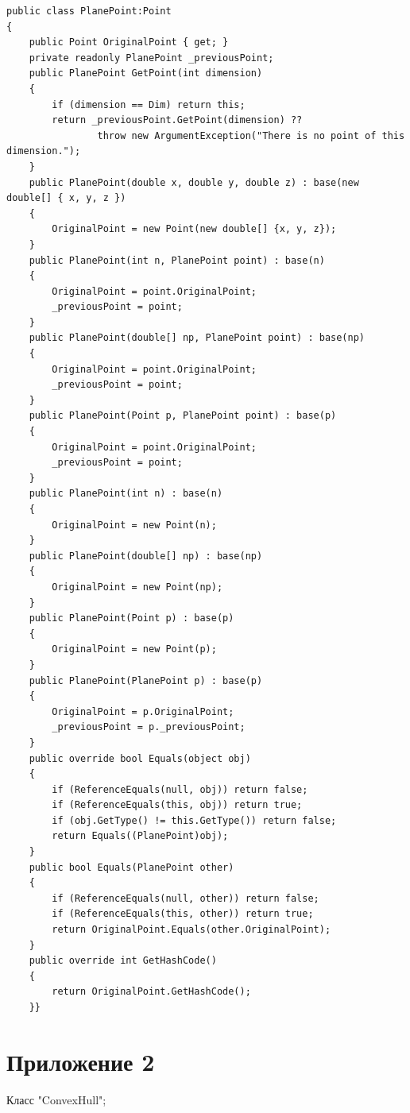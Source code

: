 \documentclass[14pt]{extarticle}
\begin{document}
\begin{lstlisting}[]
public class PlanePoint:Point
{
    public Point OriginalPoint { get; }
    private readonly PlanePoint _previousPoint;
    public PlanePoint GetPoint(int dimension)
    {
        if (dimension == Dim) return this;
        return _previousPoint.GetPoint(dimension) ??
                throw new ArgumentException("There is no point of this dimension.");
    }
    public PlanePoint(double x, double y, double z) : base(new double[] { x, y, z })
    {
        OriginalPoint = new Point(new double[] {x, y, z});
    }
    public PlanePoint(int n, PlanePoint point) : base(n)
    {
        OriginalPoint = point.OriginalPoint;
        _previousPoint = point;
    }
    public PlanePoint(double[] np, PlanePoint point) : base(np)
    {
        OriginalPoint = point.OriginalPoint;
        _previousPoint = point;
    }
    public PlanePoint(Point p, PlanePoint point) : base(p)
    {
        OriginalPoint = point.OriginalPoint;
        _previousPoint = point;
    }
    public PlanePoint(int n) : base(n)
    {
        OriginalPoint = new Point(n);
    }
    public PlanePoint(double[] np) : base(np)
    {
        OriginalPoint = new Point(np);
    }
    public PlanePoint(Point p) : base(p)
    {
        OriginalPoint = new Point(p);
    }
    public PlanePoint(PlanePoint p) : base(p)
    {
        OriginalPoint = p.OriginalPoint;
        _previousPoint = p._previousPoint;
    }
    public override bool Equals(object obj)
    {
        if (ReferenceEquals(null, obj)) return false;
        if (ReferenceEquals(this, obj)) return true;
        if (obj.GetType() != this.GetType()) return false;
        return Equals((PlanePoint)obj);
    }
    public bool Equals(PlanePoint other)
    {
        if (ReferenceEquals(null, other)) return false;
        if (ReferenceEquals(this, other)) return true;
        return OriginalPoint.Equals(other.OriginalPoint);
    }
    public override int GetHashCode()
    {
        return OriginalPoint.GetHashCode();
    }}
\end{lstlisting}
\newpage
\section*{Приложение 2}
\label{add:PlanePoint}
Класс "ConvexHull";
\end{document}
